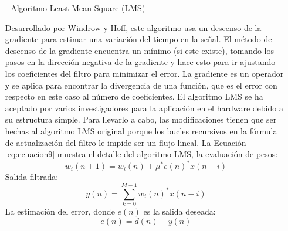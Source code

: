 \begin{enumerate}
\begin{enumerate}
\begin{enumerate}
\item[-]Algoritmo Least Mean Square (LMS)
\par
Desarrollado por Windrow y Hoff, este algoritmo usa un descenso de la gradiente para estimar una variación del tiempo en la señal. El método de descenso de la gradiente encuentra un mínimo (si este existe), tomando los pasos en la dirección negativa de la gradiente y hace esto para ir ajustando los coeficientes del filtro para minimizar el error. La gradiente es un operador y se aplica para encontrar la divergencia de una función, que es el error con respecto en este caso al número de coeficientes. 
\vskip 0.5cm
El algoritmo LMS se ha aceptado por varios investigadores para la aplicación en el hardware debido a su estructura simple. Para llevarlo a cabo, las modificaciones tienen que ser hechas al algoritmo LMS original porque los bucles recursivos en la fórmula de actualización del filtro le impide ser un flujo lineal.
\vskip 0.5cm
La Ecuación \ref{eq:ecuacion9} muestra el detalle del algoritmo LMS, la evaluación de pesos:
\begin{equation}
\label{eq:ecuacion9}
w_{i}(n+1) = w_{i}(n) + \mu^{*}e(n)^{*}x(n-i)
\end{equation}
\vskip -0.5cm
Salida filtrada:
\vskip -0.5cm
\begin{equation}
\label{eq:ecuacion10}
y(n) = \sum_{k=0}^{M-1}w_{i}(n)^{*}x(n-i)
\end{equation}
\vskip 0.5cm
La estimación del error, donde $e(n)$ es la salida deseada:
\vskip -1cm
\begin{equation}
\label{eq:ecuacion11}
e(n) = d(n) - y(n)
\end{equation}


\end{enumerate}
\end{enumerate}
\end{enumerate}

